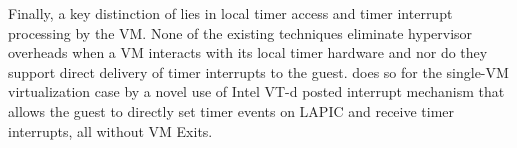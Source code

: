Finally, a key distinction of \na lies in local timer
access and timer interrupt processing by the VM.
None of the existing techniques eliminate hypervisor overheads 
when a VM interacts with its local timer hardware and nor do they 
support direct delivery of timer interrupts to the guest.
\na does so for the single-VM virtualization case by a novel use of Intel VT-d posted 
interrupt mechanism that allows the guest to directly set timer events
on LAPIC and receive timer interrupts, all without VM Exits.



%
